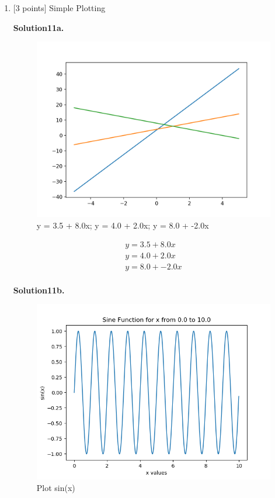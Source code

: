 \documentclass[10pt]{article}
\begin{document}
\begin{enumerate}
\pagebreak

\item \label{prob:11} [3 points] Simple Plotting


{\bf Solution11a.} 

\begin{figure}

\centering
  \includegraphics[width=\linewidth]{Figure_1.png}
 \caption{y = 3.5 + 8.0x; y = 4.0 + 2.0x; y = 8.0 + -2.0x}
\label{label}

\end{figure}

\begin{equation}
\begin{gathered}
y = 3.5 + 8.0x \\
y = 4.0 + 2.0x \\
y = 8.0 + -2.0x \\
\end{gathered}
\end{equation}

{\bf Solution11b.} 

\begin{figure}

\centering
  \includegraphics[width=\linewidth]{code/sine.png}
 \caption{Plot sin(x)}
\label{label}


\end{figure}
\end{enumerate}
\end{document}
